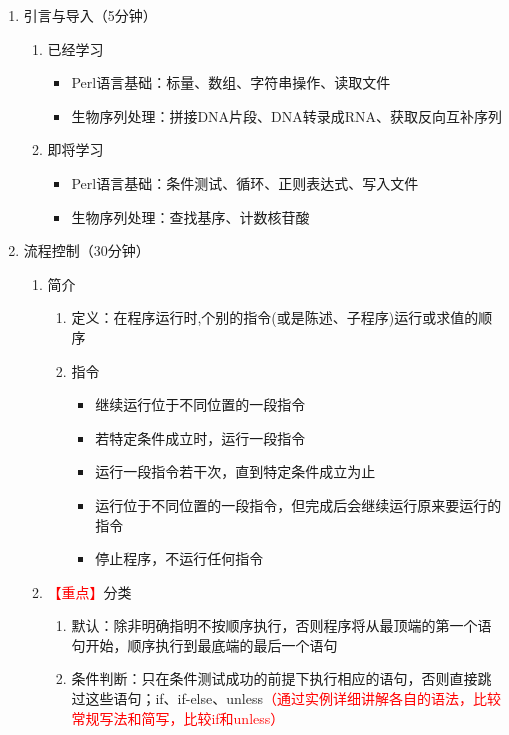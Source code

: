 \documentclass{TIJMUjiaoanLL}
\begin{document}
\begin{enumerate}
  \item 引言与导入（5分钟）
    \begin{enumerate}
      \item 已经学习
	\begin{itemize}
	  \item Perl语言基础：标量、数组、字符串操作、读取文件
	  \item 生物序列处理：拼接DNA片段、DNA转录成RNA、获取反向互补序列
	\end{itemize}
      \item 即将学习
	\begin{itemize}
	  \item Perl语言基础：条件测试、循环、正则表达式、写入文件
	  \item 生物序列处理：查找基序、计数核苷酸
	\end{itemize}
    \end{enumerate}
  \item 流程控制（30分钟）
    \begin{enumerate}
      \item 简介
	\begin{enumerate}
	  \item 定义：在程序运行时,个别的指令(或是陈述、子程序)运行或求值的顺序
	  \item 指令
	    \begin{itemize}
	      \item 继续运行位于不同位置的一段指令
	      \item 若特定条件成立时，运行一段指令
	      \item 运行一段指令若干次，直到特定条件成立为止
	      \item 运行位于不同位置的一段指令，但完成后会继续运行原来要运行的指令
	      \item 停止程序，不运行任何指令
	    \end{itemize}
	\end{enumerate}
      \item \textcolor{red}{【重点】}分类
	\begin{enumerate}
	  \item 默认：除非明确指明不按顺序执行，否则程序将从最顶端的第一个语句开始，顺序执行到最底端的最后一个语句
	  \item 条件判断：只在条件测试成功的前提下执行相应的语句，否则直接跳过这些语句；if、if-else、unless\textcolor{red}{（通过实例详细讲解各自的语法，比较常规写法和简写，比较if和unless）}
	    \begin{itemize}

\end{itemize}
\end{enumerate}
\end{enumerate}
\end{enumerate}
\end{document}
